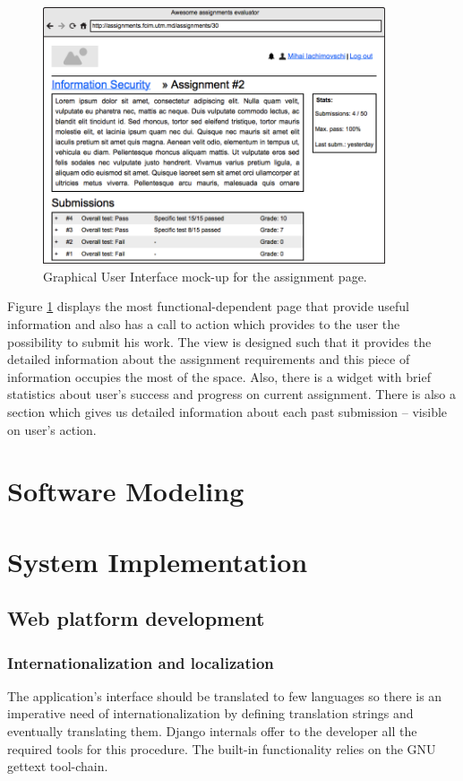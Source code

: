\documentclass[12pt,oneside,a4paper]{article}
\begin{document}
\begin{figure}[!ht]
  \centering
    \includegraphics[width=0.9\textwidth]{pic/wireframe-assignment.png}
    \caption{Graphical User Interface mock-up for the assignment page.}
    \label{fig:mock_up_assignment}
\end{figure}

Figure \ref{fig:mock_up_assignment} displays the most functional-dependent page that provide useful information and also has a call to action which provides to the user the possibility to submit his work. The view is designed such that it provides the detailed information about the assignment requirements and this piece of information occupies the most of the space. Also, there is a widget with brief statistics about user's success and progress on current assignment. There is also a section which gives us detailed information about each past submission -- visible on user's action.

\section{Software Modeling}

\section{System Implementation}
\subsection{Web platform development}
\subsubsection{Internationalization and localization}
The application's interface should be translated to few languages so there is an imperative need of internationalization by defining translation strings and eventually translating them. Django internals offer to the developer all the required tools for this procedure. The built-in functionality relies on the GNU gettext tool-chain.
\end{document}
